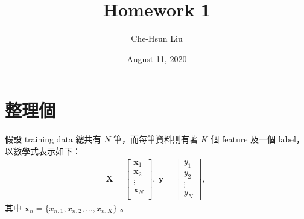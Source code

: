 \documentclass[12pt]{article}
\title{Homework 1}
\author{Che-Hsun Liu}
\date{August 11, 2020}
\begin{document}
\maketitle

\section{整理個}

假設 training data 總共有 $N$ 筆，而每筆資料則有著 $K$ 個 feature 及一個 label，以數學式表示如下：
\begin{align*}
\mathbf{X} =
    \begin{bmatrix}
    \mathbf{x}_1    \\
    \mathbf{x}_2    \\
    \vdots          \\
    \mathbf{x}_N    \\
    \end{bmatrix},\
\mathbf{y} =
    \begin{bmatrix}
    y_1     \\
    y_2     \\
    \vdots  \\
    y_N
    \end{bmatrix},\
\end{align*}
其中 $\mathbf{x}_n = \{ x_{n,1}, x_{n,2}, \ldots, x_{n,K} \}$ 。
\end{document}

